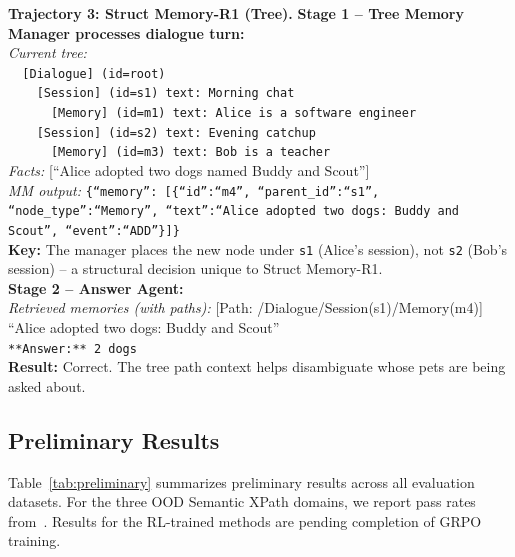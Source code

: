 \documentclass{article}
\theoremstyle{definition}
\begin{document}
\begin{tcolorbox}[aclbox, width=\linewidth]
\small
\textbf{Trajectory 3: Struct Memory-R1 (Tree).}
\textbf{Stage 1 -- Tree Memory Manager processes dialogue turn:}\\
\textit{Current tree:}\\
\texttt{~~[Dialogue] (id=root)}\\
\texttt{~~~~[Session] (id=s1) text: Morning chat}\\
\texttt{~~~~~~[Memory] (id=m1) text: Alice is a software engineer}\\
\texttt{~~~~[Session] (id=s2) text: Evening catchup}\\
\texttt{~~~~~~[Memory] (id=m3) text: Bob is a teacher}\\[2pt]
\textit{Facts:} [``Alice adopted two dogs named Buddy and Scout'']\\
\textit{MM output:} \texttt{\{``memory'': [\{``id'':``m4'', ``parent\_id'':``s1'', ``node\_type'':``Memory'', ``text'':``Alice adopted two dogs: Buddy and Scout'', ``event'':``ADD''\}]\}}\\[4pt]
\textbf{Key:} The manager places the new node under \texttt{s1} (Alice's session), not \texttt{s2} (Bob's session) -- a structural decision unique to Struct Memory-R1.\\[4pt]
\textbf{Stage 2 -- Answer Agent:}\\
\textit{Retrieved memories (with paths):} [Path: /Dialogue/Session(s1)/Memory(m4)] ``Alice adopted two dogs: Buddy and Scout''\\
\texttt{**Answer:** 2 dogs}\\[2pt]
\textbf{Result:} \textcolor{green!50!black}{Correct}. The tree path context helps disambiguate whose pets are being asked about.
\end{tcolorbox}

\subsection{Preliminary Results}

Table~\ref{tab:preliminary} summarizes preliminary results across all evaluation datasets. For the three OOD Semantic XPath domains, we report pass rates from~\citet{semanticxpath2026}. Results for the RL-trained methods are pending completion of GRPO training.
\end{document}
